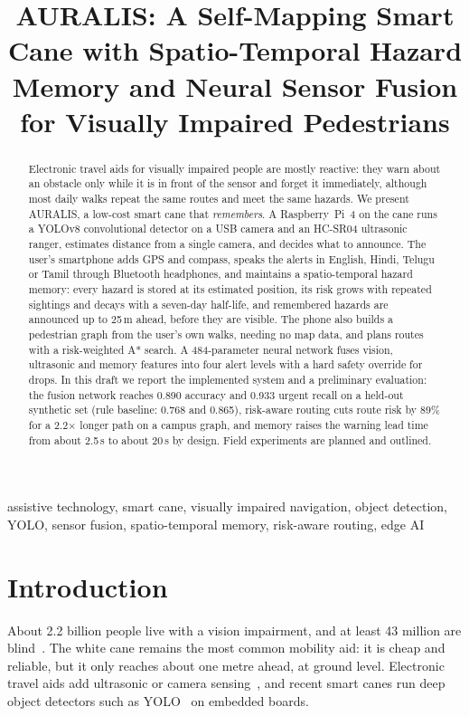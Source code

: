 \documentclass[conference]{IEEEtran}
\begin{document}
\title{AURALIS: A Self-Mapping Smart Cane with Spatio-Temporal Hazard Memory and Neural Sensor Fusion for Visually Impaired Pedestrians}

\maketitle

\begin{abstract}
Electronic travel aids for visually impaired people are mostly reactive: they warn about an obstacle only while it is in front of the sensor and forget it immediately, although most daily walks repeat the same routes and meet the same hazards. We present AURALIS, a low-cost smart cane that \emph{remembers}. A Raspberry~Pi~4 on the cane runs a YOLOv8 convolutional detector on a USB camera and an HC-SR04 ultrasonic ranger, estimates distance from a single camera, and decides what to announce. The user's smartphone adds GPS and compass, speaks the alerts in English, Hindi, Telugu or Tamil through Bluetooth headphones, and maintains a spatio-temporal hazard memory: every hazard is stored at its estimated position, its risk grows with repeated sightings and decays with a seven-day half-life, and remembered hazards are announced up to 25\,m ahead, before they are visible. The phone also builds a pedestrian graph from the user's own walks, needing no map data, and plans routes with a risk-weighted A* search. A 484-parameter neural network fuses vision, ultrasonic and memory features into four alert levels with a hard safety override for drops. In this draft we report the implemented system and a preliminary evaluation: the fusion network reaches 0.890 accuracy and 0.933 urgent recall on a held-out synthetic set (rule baseline: 0.768 and 0.865), risk-aware routing cuts route risk by 89\% for a 2.2$\times$ longer path on a campus graph, and memory raises the warning lead time from about 2.5\,s to about 20\,s by design. Field experiments are planned and outlined.
\end{abstract}

\begin{IEEEkeywords}
assistive technology, smart cane, visually impaired navigation, object detection, YOLO, sensor fusion, spatio-temporal memory, risk-aware routing, edge AI
\end{IEEEkeywords}

\section{Introduction}
About 2.2 billion people live with a vision impairment, and at least 43 million are blind~\cite{who2019,bourne2017}. The white cane remains the most common mobility aid: it is cheap and reliable, but it only reaches about one metre ahead, at ground level. Electronic travel aids add ultrasonic or camera sensing~\cite{dakopoulos2010,elmannai2017,kuriakose2022}, and recent smart canes run deep object detectors such as YOLO~\cite{redmon2016} on embedded boards.
\end{document}
